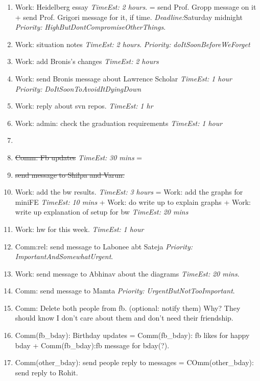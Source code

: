 \documentclass[11pt]{article}
\newcommand{\doneTask}[1]{\item \sout{\small #1}}
\newcommand{\te}[1]{\textit{TimeEst:} \textit{#1}}
\newcommand{\priority}[1]{\textit{Priority:} \textit{#1}}
\newcommand{\prio}[1]{\textit{Priority:} \textit{#1}}
\newcommand{\dl}[1]{\textit{Deadline:}#1}
\begin{document}
\begin{enumerate}
\item Work: Heidelberg essay \te{2 hours}. =  send Prof. Gropp message
  on it  + send Prof. Grigori message for it, if time.  \dl{Saturday
    midnight} \prio{HighButDontCompromiseOtherThings}. 

\item Work: situation notes \te{2 hours}. \prio{doItSoonBeforeWeForget} 

\item Work: add Bronis's changes \te{2 hours} 

\item Work: send Bronis message about Lawrence Scholar \te{1 hour} \prio{DoItSoonToAvoidItDyingDown} 

\item Work: reply about svn repos. \te{1 hr} 

\item Work: admin: check the graduation requirements \te{1 hour} 

\item \doneTask{Comm: Fb updates} \te{30 mins} = \doneTask{send message to
  Shilpa and Varun.} 

\item Work: add the bw results. \te{3 hours}  =  Work: add the graphs
  for miniFE \te{10 mins}   +  Work: do write up to explain graphs +
  Work: write up explanation of setup for bw  \te{20 mins} 

\item Work: hw for this week. \te{1 hour} 

\item Comm:rel: send message to Labonee abt Sateja \priority{ImportantAndSomewhatUrgent}. 

\item Work: send message to Abhinav about the diagrams \te{20 mins}. 

\item Comm: send message to Mamta
  \priority{UrgentButNotTooImportant}. 

\item Comm: Delete both people from fb. (optional: notify them) Why?
 They should know I don't care about them and don't need their friendship. 

\item Comm(fb\_bday): Birthday updates = Comm(fb\_bday): fb likes for happy bday  + Comm(fb\_bday):fb message for bday(?). 
\item Comm(other\_bday): send people reply to messages = COmm(other\_bday): send reply to Rohit. 
\end{enumerate}
 
\end{document}
